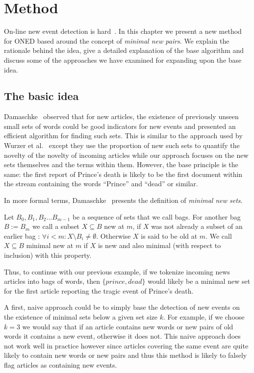 \chapter{Method}
\label{chapter:method}
On-line new event detection is hard~\cite{allan2000hard}. In this chapter we present a new method for ONED based around the concept of \emph{minimal new pairs}. We explain the rationale behind the idea, give a detailed explanation of the base algorithm and discuss some of the approaches we have examined for expanding upon the base idea.


\section{The basic idea}
\label{section:idea}
Damaschke~\cite{damaschke2015pairs} observed that for new articles, the existence of previously unseen small sets of words could be good indicators for new events and presented an efficient algorithm for finding such sets. This is similar to the approach used by Wurzer et al.~\cite{wurzer2015kterm} except they use the proportion of new such sets to quantify the novelty of the novelty of incoming articles while our approach focuses on the new sets themselves and the terms within them. However, the base principle is the same: the first report of Prince's death is likely to be the first document within the stream containing the words ``Prince'' and ``dead'' or similar. 

In more formal terms, Damaschke~\cite{damaschke2015pairs} presents the definition of \emph{minimal new sets}. 

\begin{definition}
  Let $B_0, B_1, B_2...B_{m-1}$ be a sequence of sets that we call bags. For another bag $B:=B_{m}$ we call a subset $X \subseteq B$ new at $m$, if $X$ was not already a subset of an earlier bag : $\forall i < m : X \setminus B_{i} \neq \emptyset$. Otherwise $X$ is said to be old at $m$. We call $X \subseteq B$ minimal new at $m$ if $X$ is new and also minimal (with respect to inclusion) with this property.
\end{definition}

Thus, to continue with our previous example, if we tokenize incoming news articles into bags of words, then $\{prince, dead\}$ would likely be a minimal new set for the first article reporting the tragic event of Prince's death.

A first, naive approach could be to simply base the detection of new events on the existence of minimal sets below a given set size $k$. For example, if we choose $k=3$ we would say that if an article contains new words or new pairs of old words it contains a new event, otherwise it does not. This naive approach does not work well in practice however since articles covering the same event are quite likely to contain new words or new pairs and thus this method is likely to falsely flag articles as containing new events.

